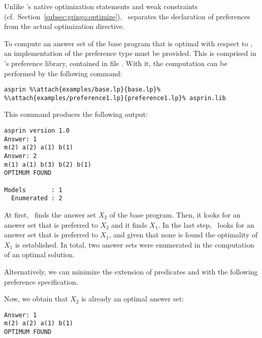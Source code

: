 \begin{example}
\begin{note}\label{asprin:note}
Unlike \gringo's native optimization statements and weak constraints (cf.\ Section~\ref{subsec:gringo:optimize}),
\asprin\ separates the declaration of preferences from the actual optimization directive.
\end{note}

To compute an answer set of the base program that is optimal with respect to , 
an implementation of the preference type  must be provided.
This is comprised in \asprin's preference library,
contained in file .
With it, the computation can be performed by the following command:
%
%
\begin{lstlisting}[numbers=none,escapechar=\%]
asprin %\attach{examples/base.lp}{base.lp}% %\attach{examples/preference1.lp}{preference1.lp}% asprin.lib
\end{lstlisting}
%
This command produces the following output:
%
\begin{lstlisting}[numbers=none]
asprin version 1.0
Answer: 1
m(2) a(2) a(1) b(1)
Answer: 2
m(1) a(1) b(3) b(2) b(1)
OPTIMUM FOUND

Models       : 1
  Enumerated : 2

\end{lstlisting}
%
At first, \asprin\ finds the answer set $X_2$ of the base program. 
Then, it looks for an answer set that is preferred to $X_2$ and it finds $X_1$. 
In the last step, \asprin\ looks for an answer set that is preferred to $X_1$,  
and given that none is found the optimality of $X_1$ is established. 
In total, two answer sets were enumerated in the computation of an optimal solution.

Alternatively,
we can minimize the extension of predicates  and  with the following preference specification.
%

%
Now, we obtain that $X_2$ is already an optimal answer set: 
\begin{lstlisting}[numbers=none]
Answer: 1
m(2) a(2) a(1) b(1)
OPTIMUM FOUND
\end{lstlisting}
\end{example}

